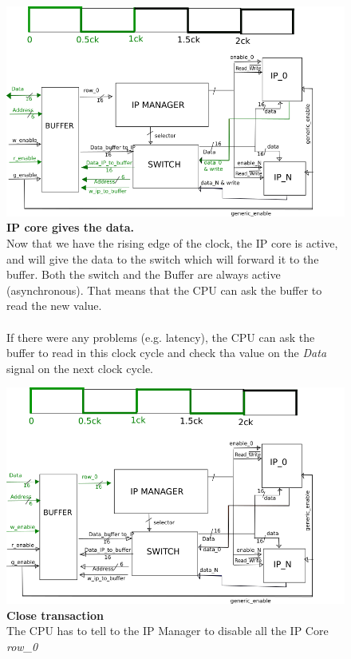    \begin{figure}[h]
   	\centering
   	\includegraphics[scale=0.75]{chapters/figures/read_2.png}  
   	\caption{\textbf{IP core gives the data.} \\
   		Now that we have the rising edge of the clock, the IP core is active, and will give the data to the switch which will forward it to the buffer. Both the switch and the Buffer are always active (asynchronous). That means that the CPU can ask the buffer to read the new value.\\\\
   		If there were any problems (e.g. latency), the CPU can ask the buffer to read in this clock cycle and check tha value on the \textit{Data} signal on the next clock cycle.}
   	\label{fig:2}
   \end{figure}
   
    \begin{figure}[h]
    	\centering
    	\includegraphics[scale=0.75]{chapters/figures/read_3.png}  
    	\caption{\textbf{Close transaction}\\ The CPU has to tell to the IP Manager to disable all the IP Core \textit{row\_0}}
    	\label{fig:3}
    \end{figure}
    
